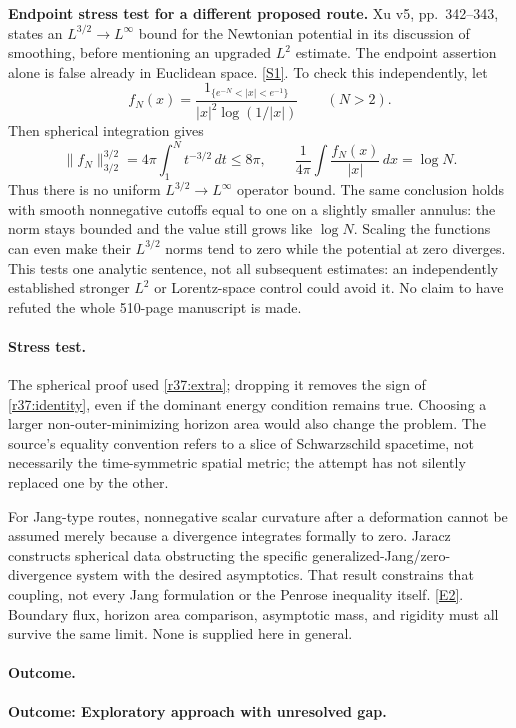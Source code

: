 \documentclass[11pt,a4paper]{article}
\newcommand{\sref}[2]{\hyperlink{source:#1:#2}{[S#2]}}
\newcommand{\eref}[2]{\hyperlink{extra:#1:#2}{[E#2]}}
\numberwithin{equation}{section}
\begin{document}
\textbf{Endpoint stress test for a different proposed route.}
Xu v5, pp.~342--343, states an $L^{3/2}\to L^\infty$ bound for the Newtonian
potential in its discussion of smoothing, before mentioning an upgraded
$L^2$ estimate. The endpoint assertion alone is false already in Euclidean
space. \sref{statement}{1}. To check this independently, let
\[
 f_N(x)=\frac{1_{\{e^{-N}<|x|<e^{-1}\}}}
 {|x|^2\log(1/|x|)}\qquad(N>2).
\]
Then spherical integration gives
\[
 \|f_N\|_{3/2}^{3/2}=4\pi\int_1^N t^{-3/2}\,dt\le8\pi,
 \qquad \frac1{4\pi}\int\frac{f_N(x)}{|x|}\,dx=\log N.
\]
Thus there is no uniform $L^{3/2}\to L^\infty$ operator bound. The same
conclusion holds with smooth nonnegative cutoffs equal to one on a slightly
smaller annulus: the norm stays bounded and the value still grows like
$\log N$. Scaling the functions can even make their $L^{3/2}$ norms tend to
zero while the potential at zero diverges. This tests one analytic sentence,
not all subsequent estimates: an independently established stronger $L^2$
or Lorentz-space control could avoid it. No claim to have refuted the whole
510-page manuscript is made.

\paragraph{Stress test.}
The spherical proof used \eqref{r37:extra}; dropping it removes the sign of
\eqref{r37:identity}, even if the dominant energy condition remains true.
Choosing a larger non-outer-minimizing horizon area would also change the
problem. The source's equality convention refers to a slice of Schwarzschild
spacetime, not necessarily the time-symmetric spatial metric; the attempt
has not silently replaced one by the other.

For Jang-type routes, nonnegative scalar curvature after a deformation cannot
be assumed merely because a divergence integrates formally to zero. Jaracz
constructs spherical data obstructing the specific generalized-Jang/zero-
divergence system with the desired asymptotics. That result constrains that
coupling, not every Jang formulation or the Penrose inequality itself.
\eref{statement}{2}. Boundary flux, horizon area comparison, asymptotic mass, and
rigidity must all survive the same limit. None is supplied here in general.

\paragraph{Outcome.}
\textbf{Outcome: Exploratory approach with unresolved gap.}
\end{document}
